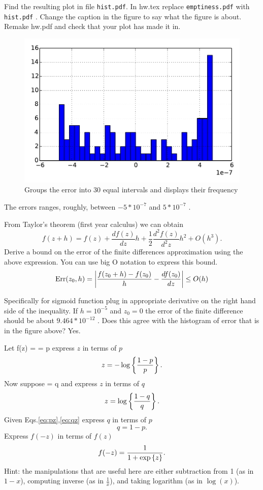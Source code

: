 \documentclass{article}
\begin{document}
Find the resulting plot in file {\tt hist.pdf}. In hw\theHW.tex replace {\tt emptiness.pdf} with {\tt hist.pdf} . Change the
caption in the figure to say what the figure is about. Remake hw\theHW.pdf and check that your plot has made it in.
\begin{figure}[H]
\begin{center}
\includegraphics[scale=0.5]{hist.pdf}
\caption{Groups the error into 30 equal intervals and displays their frequency}
\end{center}
\end{figure}



\begin{remark} The errors ranges, roughly, between \( -5*10^{-7}\) and \(5*10^{-7}\) .
\end{remark}

\newproblem{1pt}
From Taylor's theorem (first year calculus) we can obtain
\[
f(z+h) = f(z) + \frac{df(z)}{dz}h + \frac{1}{2}\frac{d^2f(z)}{d^2z}h^2 + O(h^3).
\]
Derive a bound on the error of the finite differences approximation using the above expression. You can use big O notation to express this bound.
\[
\textrm{Err}(z_0,h) = \left| \frac{f(z_0+h) - f(z_0)}{h} - \frac{df(z_0)}{dz} \right| \leq O(h)
\]

Specifically for sigmoid function plug in appropriate derivative on the right hand side of the inequality. If $h=10^{-5}$ and $z_0 = 0$ the error of the finite difference should be about \(9.464*10^{-12}\) .
Does this agree with the histogram of error that is in the figure above? Yes.

\newproblem{1pt}
Let
\BEQ\label{eq:pz}
f(z) =  = p
\EEQ
express $z$ in terms of $p$
\[
z = -\mathop{\rm log}\left\{\frac{1-p}{p} \right\}.
\]
Now suppose
\BEQ\label{eq:qz}
 = q
\EEQ
and express $z$ in terms of $q$
\[
z = \mathop{\rm log}\left\{\frac{1-q}{q} \right\}.
\]
Given Eqs.\eqref{eq:pz},\eqref{eq:qz} express $q$ in terms of $p$
\[
q = 1-p.
\]
Express $f(-z)$ in terms of $f(z)$
\[
f(-z) = \frac{1}{1 + \mathop{\rm exp}\left\{z\right\}}.
\]
Hint: the manipulations that are useful here are either subtraction from 1 (as in $1-x$), computing inverse (as in $\frac{1}{x}$), and taking logarithm (as in $\log(x)$).
\end{document}
